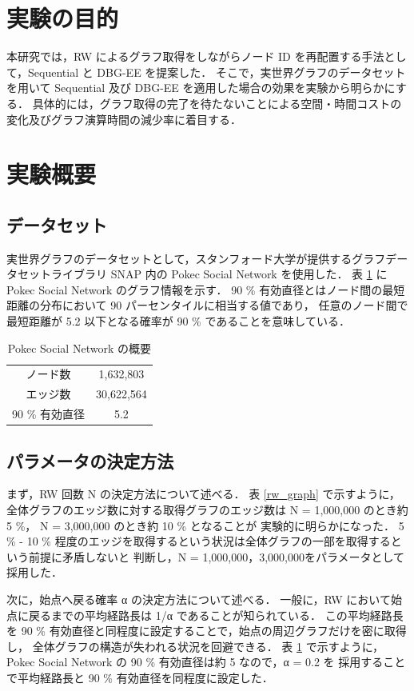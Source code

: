 \section{実験の目的}
本研究では，RW によるグラフ取得をしながらノード ID を再配置する手法として，Sequential と DBG-EE を提案した．
そこで，実世界グラフのデータセットを用いて Sequential 及び DBG-EE を適用した場合の効果を実験から明らかにする．
具体的には，グラフ取得の完了を待たないことによる空間・時間コストの変化及びグラフ演算時間の減少率に着目する．
\section{実験概要}
\subsection{データセット}
実世界グラフのデータセットとして，スタンフォード大学が提供するグラフデータセットライブラリ SNAP \cite{snapnets} 内の 
Pokec Social Network \cite{takac2012data} を使用した．
表 \ref{dataset} に Pokec Social Network のグラフ情報を示す．
90 \% 有効直径とはノード間の最短距離の分布において 90 パーセンタイルに相当する値であり，
任意のノード間で最短距離が 5.2 以下となる確率が 90 \% であることを意味している．
\begin{table}[t]
  \begin{center}
    \caption{Pokec Social Network の概要}
    \begin{tabular}{cc} \toprule
      ノード数 & 1,632,803 \\
      エッジ数 & 30,622,564 \\
      90 \% 有効直径 & 5.2 \\ \bottomrule
    \end{tabular}
    \label{dataset}
  \end{center}
\end{table}

\subsection{パラメータの決定方法}
まず，RW 回数 N の決定方法について述べる．
表 \ref{rw_graph} で示すように，全体グラフのエッジ数に対する取得グラフのエッジ数は N = 1,000,000 のとき約 5 \%， N = 3,000,000 のとき約 10 \% となることが
実験的に明らかになった．
5 \% - 10 \% 程度のエッジを取得するという状況は全体グラフの一部を取得するという前提に矛盾しないと
判断し，N = 1,000,000，3,000,000をパラメータとして採用した．

次に，始点へ戻る確率 α の決定方法について述べる．
一般に，RW において始点に戻るまでの平均経路長は 1/α であることが知られている．
この平均経路長を 90 \% 有効直径と同程度に設定することで，始点の周辺グラフだけを密に取得し，
全体グラフの構造が失われる状況を回避できる．
表 \ref{dataset} で示すように，Pokec Social Network の 90 \% 有効直径は約 5 なので，α = 0.2 を
採用することで平均経路長と 90 \% 有効直径を同程度に設定した． 

